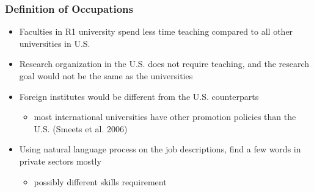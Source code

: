 \documentclass[11pt]{beamer}
\begin{document}
\begin{frame}[label=Occupation]
	\frametitle{Definition of Occupations}
	\begin{itemize}
	
			\item Faculties in R1 university spend less time teaching compared to all other universities in U.S.  \hyperlink{teaching}{}
		\vspace{1.5 mm}
			\item Research organization in the U.S. does not require teaching, and the research goal would not be the same as the universities
			\vspace{1.5 mm}
			\item Foreign institutes would be different from the U.S. counterparts
			\begin{itemize}
				\item most international universities have other promotion policies than the U.S. (Smeets et al. 2006)
			\end{itemize}
		\vspace{1.5 mm}
			\item Using natural language process on the job descriptions, find a few words in private sectors mostly  \hyperlink{NLP}{}
				\begin{itemize}
					\item possibly different skills requirement
				\end{itemize}
		\end{itemize}

\end{frame}
\end{document}
